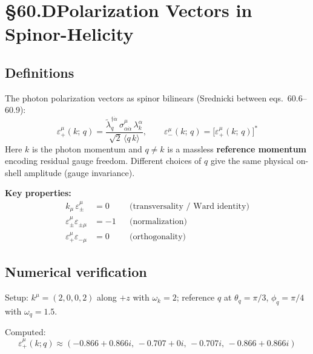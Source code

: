 \section{§60.D\quad Polarization Vectors in Spinor-Helicity}

\subsection{Definitions}

The photon polarization vectors as spinor bilinears
(Srednicki between eqs.~60.6--60.9):
\begin{equation}
  \boxed{
    \varepsilon_+^\mu(k;\,q) = \frac{\tilde\lambda_q^{\dagger\dot\alpha}\,\sigma^\mu_{\alpha\dot\alpha}\,\lambda_k^\alpha}{\sqrt{2}\,\langle q\,k\rangle},
    \qquad
    \varepsilon_-^\mu(k;\,q) = \bigl[\varepsilon_+^\mu(k;\,q)\bigr]^*
  }
  \tag{60.6}
\end{equation}
Here $k$ is the photon momentum and $q\neq k$ is a massless \textbf{reference
momentum} encoding residual gauge freedom.  Different choices of $q$ give the
same physical on-shell amplitude (gauge invariance).

\textbf{Key properties:}
\begin{align}
  k_\mu\,\varepsilon_\pm^\mu &= 0
  &&\text{(transversality / Ward identity)}
  \tag{60.7}\\
  \varepsilon_\pm^\mu\varepsilon_{\pm\mu} &= -1
  &&\text{(normalization)}
  \tag{60.8}\\
  \varepsilon_+^\mu\varepsilon_{-\mu} &= 0
  &&\text{(orthogonality)}
  \tag{60.9}
\end{align}

\subsection{Numerical verification}

Setup: $k^\mu=(2,0,0,2)$ along $+z$ with $\omega_k=2$; reference $q$ at
$\theta_q=\pi/3$, $\phi_q=\pi/4$ with $\omega_q=1.5$.

Computed:
\[
  \varepsilon_+^\mu(k;q) \approx (-0.866+0.866i,\,-0.707+0i,\,-0.707i,\,-0.866+0.866i)
\]


